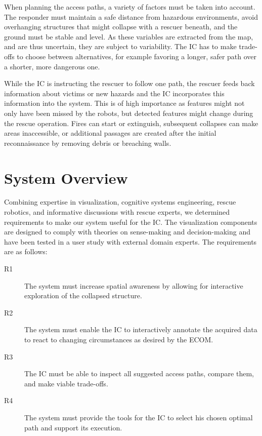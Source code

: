 \documentclass{egpubl}
\begin{document}
When planning the access paths, a variety of factors must be taken into account. The responder must maintain a safe distance from hazardous environments, avoid overhanging structures that might collapse with a rescuer beneath, and the ground must be stable and level. As these variables are extracted from the map, and are thus uncertain, they are subject to variability. The IC has to make trade-offs to choose between alternatives, for example favoring a longer, safer path over a shorter, more dangerous one.

While the IC is instructing the rescuer to follow one path, the rescuer feeds back information about victims or new hazards and the IC incorporates this information into the system. This is of high importance as features might not only have been missed by the robots, but detected features might change during the rescue operation. Fires can start or extinguish, subsequent collapses can make areas inaccessible, or additional passages are created after the initial reconnaissance by removing debris or breaching walls.


\section{System Overview} \label{sec:overview}

Combining expertise in visualization, cognitive systems engineering, rescue robotics, and informative discussions with rescue experts, we determined requirements to make our system useful for the IC. The visualization components are designed to comply with theories on sense-making and decision-making and have been tested in a user study with external domain experts. The requirements are as follows:
\begin{description}
\item[R1] The system must increase spatial awareness by allowing for interactive exploration of the collapsed structure.
\item[R2] The system must enable the IC to interactively annotate the acquired data to react to changing circumstances as desired by the ECOM.
\item[R3] The IC must be able to inspect all suggested access paths, compare them, and make viable trade-offs.
\item[R4] The system must provide the tools for the IC to select his chosen optimal path and support its execution.
\end{description}
\end{document}
